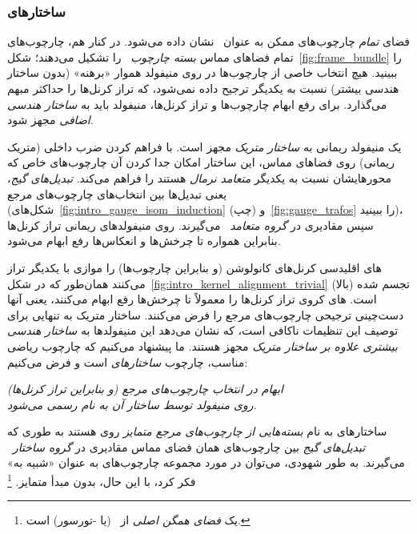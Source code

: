 \subsubsection{ساختارهای }
\label{sec:visual_intro_GM_subsub}

فضای \emph{تمام} چارچوب‌های ممکن \lr{$\TpM$} به عنوان~\lr{$\FpM$} نشان داده می‌شود.
در کنار هم، چارچوب‌های تمام فضاهای مماس \emph{بسته چارچوب}~\lr{$\FM$} را تشکیل می‌دهند؛ شکل~\ref{fig:frame_bundle} را ببینید.
هیچ انتخاب خاصی از چارچوب‌ها در \lr{$\FM$} روی منیفولد هموار «برهنه» (بدون ساختار هندسی بیشتر) نسبت به یکدیگر ترجیح داده نمی‌شود، که تراز کرنل‌ها را حداکثر مبهم می‌گذارد.
برای رفع ابهام چارچوب‌ها و تراز کرنل‌ها، منیفولد باید به \emph{ساختار هندسی اضافی} مجهز شود.


یک منیفولد ریمانی به \emph{ساختار متریک} مجهز است.
با فراهم کردن ضرب داخلی (متریک ریمانی) روی فضاهای مماس، این ساختار امکان جدا کردن آن چارچوب‌های خاص که محورهایشان نسبت به یکدیگر \emph{متعامد نرمال} هستند را فراهم می‌کند.
\emph{تبدیل‌های گیج}، یعنی تبدیل‌ها بین انتخاب‌های چارچوب‌های مرجع (شکل‌های~\ref{fig:intro_gauge_isom_induction} (چپ) و~\ref{fig:gauge_trafos} را ببینید)، سپس مقادیری در \emph{گروه متعامد}~ می‌گیرند.
روی منیفولدهای ریمانی تراز کرنل‌ها بنابراین همواره تا چرخش‌ها و انعکاس‌ها رفع ابهام می‌شود.


های اقلیدسی کرنل‌های کانولوشن (و بنابراین چارچوب‌ها) را
موازی با یکدیگر تراز می‌کنند همان‌طور که در شکل~\ref{fig:intro_kernel_alignment_trivial} (بالا) تجسم شده است.
های کروی تراز کرنل‌ها را معمولاً تا چرخش‌ها رفع ابهام می‌کنند، یعنی آنها دست‌چینی ترجیحی چارچوب‌های مرجع را فرض می‌کنند.
ساختار متریک به تنهایی برای توصیف این تنظیمات ناکافی است، که نشان می‌دهد این منیفولدها به \emph{ساختار هندسی بیشتری علاوه بر ساختار متریک} مجهز هستند.
ما پیشنهاد می‌کنیم که چارچوب ریاضی مناسب، چارچوب \emph{ساختارهای}  است و فرض می‌کنیم:

\begin{minipage}{\textwidth}
	\begin{center}\it
		ابهام در انتخاب چارچوب‌های مرجع (و بنابراین تراز کرنل‌ها) \\
		روی منیفولد  توسط ساختار  آن به نام \lr{$\GM$} رسمی می‌شود.
	\end{center}
\end{minipage}

ساختارهای  به نام \lr{$\GM$} \emph{بسته‌هایی از چارچوب‌های مرجع متمایز} روی  هستند به طوری که \emph{تبدیل‌های گیج} بین چارچوب‌های همان فضای مماس مقادیری در \emph{گروه ساختار}~ می‌گیرند.
به طور شهودی، می‌توان در مورد مجموعه \lr{$\GpM$} چارچوب‌های \lr{$\TpM$} به عنوان «شبیه به»  فکر کرد، با این حال، بدون مبدأ متمایز.%
\footnote{
	\lr{$\GpM$} یک \emph{فضای همگن اصلی} از~ (یا -تورسور) است.
}



